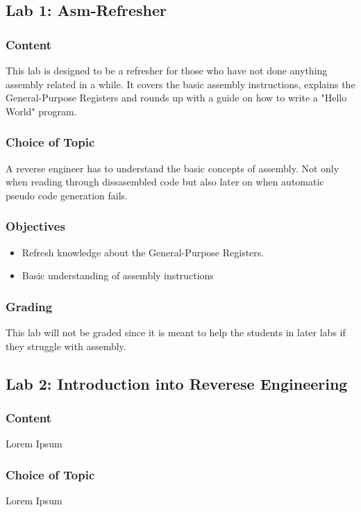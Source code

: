 
\subsection{Lab 1: Asm-Refresher}
\subsubsection*{Content}
This lab is designed to be a refresher for those who have not done anything assembly related in a while. It covers the basic assembly instructions, explains the General-Purpose Registers and rounds up with a guide on how to write a "Hello World" program.  
\subsubsection*{Choice of Topic}
A reverse engineer has to understand the basic concepts of assembly. Not only when reading through dissasembled code but also later on when automatic pseudo code generation fails.
\subsubsection*{Objectives}
\begin{itemize}
    \item Refresh knowledge about the General-Purpose Registers.
    \item Basic understanding of assembly instructions
\end{itemize}
\subsubsection*{Grading}
This lab will not be graded since it is meant to help the students in later labs if they struggle with assembly.


\subsection{Lab 2: Introduction into Reverese Engineering}
\subsubsection*{Content}
Lorem Ipsum
\subsubsection*{Choice of Topic}
Lorem Ipsum
